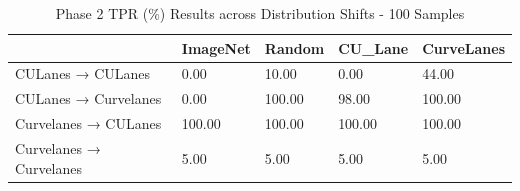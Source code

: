 \begin{table}
\caption{Phase 2 TPR (\%) Results across Distribution Shifts - 100 Samples}
\label{tab:phase2_tpr_100}
\begin{tabular}{lllll}
\toprule
 & ImageNet & Random & CU_Lane & CurveLanes \\
\midrule
CULanes → CULanes & 0.00 & 10.00 & 0.00 & 44.00 \\
CULanes → Curvelanes & 0.00 & 100.00 & 98.00 & 100.00 \\
Curvelanes → CULanes & 100.00 & 100.00 & 100.00 & 100.00 \\
Curvelanes → Curvelanes & 5.00 & 5.00 & 5.00 & 5.00 \\
\bottomrule
\end{tabular}
\end{table}
